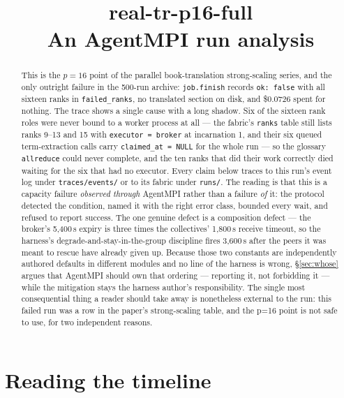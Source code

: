 \documentclass[11pt]{article}
\title{\textbf{real-tr-p16-full}\\[2pt]\large An AgentMPI run analysis}
\author{}
\date{}
\begin{document}
\maketitle

\begin{abstract}
This is the $p=16$ point of the parallel book-translation strong-scaling series, and the
only outright failure in the 500-run archive: \texttt{job.finish} records
\texttt{ok: false} with all sixteen ranks in \texttt{failed\_ranks}, no translated
section on disk, and \$0.0726 spent for nothing. The trace shows a single cause with a
long shadow. Six of the sixteen rank roles were never bound to a worker process at all
--- the fabric's \texttt{ranks} table still lists ranks 9--13 and 15 with
\texttt{executor = broker} at incarnation 1, and their six queued term-extraction calls
carry \texttt{claimed\_at = NULL} for the whole run --- so the glossary
\texttt{allreduce} could never complete, and the ten ranks that did their work correctly
died waiting for the six that had no executor. Every claim below traces to this run's
event log under \texttt{traces/events/} or to its fabric under \texttt{runs/}. The reading
is that this is a capacity
failure \emph{observed through} AgentMPI rather than a failure \emph{of} it: the
protocol detected the condition, named it with the right error class, bounded every wait,
and refused to report success. The one genuine defect is a composition defect --- the
broker's 5{,}400\,s expiry is three times the collectives' 1{,}800\,s receive timeout, so
the harness's degrade-and-stay-in-the-group discipline fires 3{,}600\,s after the peers
it was meant to rescue have already given up. Because those two constants are
independently authored defaults in different modules and no line of the harness is wrong,
\S\ref{sec:whose} argues that AgentMPI should own that ordering --- reporting it, not
forbidding it --- while the mitigation stays the harness author's responsibility. The
single most consequential thing a reader should take away is nonetheless external to the
run: this failed run was a row in the paper's strong-scaling table, and the p=16 point is
not safe to use, for two independent reasons.
\end{abstract}



\section{Reading the timeline}
\end{document}
